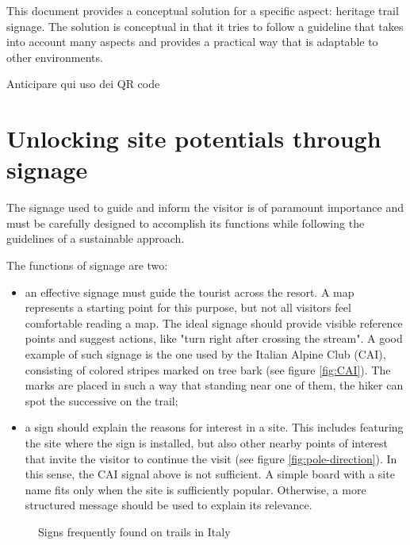 \documentclass[sustainability,article,submit,pdftex,moreauthors]{Definitions/mdpi}
\begin{document}
This document provides a conceptual solution for a specific aspect: heritage trail signage. The solution is conceptual in that it tries to follow a guideline that takes into account many aspects and provides a practical way that is adaptable to other environments.

{\huge Anticipare qui uso dei QR code}

\section{Unlocking site potentials through signage \label{sec:signage}}

The signage used to guide and inform the visitor is of paramount importance and must be carefully designed to accomplish its functions while following the guidelines of a sustainable approach.

The functions of signage are two:
\begin {itemize}
\item an effective signage must guide the tourist across the resort. A map represents a starting point for this purpose, but not all visitors feel comfortable reading a map. The ideal signage should provide visible reference points and suggest actions, like "turn right after crossing the stream". A good example of such signage is the one used by the Italian Alpine Club (CAI), consisting of colored stripes marked on tree bark (see figure \ref{fig:CAI}). The marks are placed in such a way that standing near one of them, the hiker can spot the successive on the trail;
\item a sign should explain the reasons for interest in a site. This includes featuring the site where the sign is installed, but also other nearby points of interest that invite the visitor to continue the visit (see figure \ref{fig:pole-direction}). In this sense, the CAI signal above is not sufficient. A simple board with a site name fits only when the site is sufficiently popular. Otherwise, a more structured message should be used to explain its relevance.
\end{itemize}

\begin{figure}
\hfill
{}
\caption{Signs frequently found on trails in Italy}
\label{fig:traditional}
\end{figure}
\end{document}
